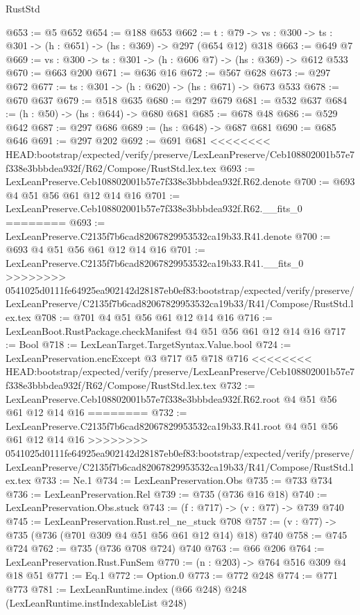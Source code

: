 \begin{lexlean}{RustStd}
\begin{coremodule}
{\begin{coremodule}
@653 := @5 @652
@654 := @188 @653
@662 := {t : @79} -> {vs : @300} -> {ts : @301} -> (h : @651) -> (hs : @369) -> @297 (@654 @12) @318
@663 := @649 @7
@669 := {vs : @300} -> {ts : @301} -> (h : @606 @7) -> (hs : @369) -> @612 @533
@670 := @663 @200
@671 := @636 @16
@672 := @567 @628
@673 := @297 @672
@677 := {ts : @301} -> (h : @620) -> (hs : @671) -> @673 @533
@678 := @670 @637
@679 := @518 @635
@680 := @297 @679
@681 := @532 @637
@684 := (h : @50) -> (hs : @644) -> @680 @681
@685 := @678 @48
@686 := @529 @642
@687 := @297 @686
@689 := (hs : @648) -> @687 @681
@690 := @685 @646
@691 := @297 @202
@692 := @691 @681
<<<<<<<< HEAD:bootstrap/expected/verify/preserve/LexLeanPreserve/Ceb108802001b57e7f338e3bbbdea932f/R62/Compose/RustStd.lex.tex
@693 := LexLeanPreserve.Ceb108802001b57e7f338e3bbbdea932f.R62.denote
@700 := @693 @4 @51 @56 @61 @12 @14 @16
@701 := LexLeanPreserve.Ceb108802001b57e7f338e3bbbdea932f.R62.__fits_0
========
@693 := LexLeanPreserve.C2135f7b6cad82067829953532ca19b33.R41.denote
@700 := @693 @4 @51 @56 @61 @12 @14 @16
@701 := LexLeanPreserve.C2135f7b6cad82067829953532ca19b33.R41.__fits_0
>>>>>>>> 0541025d0111fe64925ea902142d28187eb0ef83:bootstrap/expected/verify/preserve/LexLeanPreserve/C2135f7b6cad82067829953532ca19b33/R41/Compose/RustStd.lex.tex
@708 := @701 @4 @51 @56 @61 @12 @14 @16
@716 := LexLeanBoot.RustPackage.checkManifest @4 @51 @56 @61 @12 @14 @16
@717 := Bool
@718 := LexLeanTarget.TargetSyntax.Value.bool
@724 := LexLeanPreservation.encExcept @3 @717 @5 @718 @716
<<<<<<<< HEAD:bootstrap/expected/verify/preserve/LexLeanPreserve/Ceb108802001b57e7f338e3bbbdea932f/R62/Compose/RustStd.lex.tex
@732 := LexLeanPreserve.Ceb108802001b57e7f338e3bbbdea932f.R62.root @4 @51 @56 @61 @12 @14 @16
========
@732 := LexLeanPreserve.C2135f7b6cad82067829953532ca19b33.R41.root @4 @51 @56 @61 @12 @14 @16
>>>>>>>> 0541025d0111fe64925ea902142d28187eb0ef83:bootstrap/expected/verify/preserve/LexLeanPreserve/C2135f7b6cad82067829953532ca19b33/R41/Compose/RustStd.lex.tex
@733 := Ne.{1}
@734 := LexLeanPreservation.Obs
@735 := @733 @734
@736 := LexLeanPreservation.Rel
@739 := @735 (@736 @16 @18)
@740 := LexLeanPreservation.Obs.stuck
@743 := (f : @717) -> (v : @77) -> @739 @740
@745 := LexLeanPreservation.Rust.rel_ne_stuck @708
@757 := (v : @77) -> @735 (@736 (@701 @309 @4 @51 @56 @61 @12 @14) @18) @740
@758 := @745 @724
@762 := @735 (@736 @708 @724) @740
@763 := @66 @206
@764 := LexLeanPreservation.Rust.FunSem
@770 := (n : @203) -> @764 @516 @309 @4 @18 @51
@771 := Eq.{1}
@772 := Option.{0}
@773 := @772 @248
@774 := @771 @773
@781 := LexLeanRuntime.index (@66 @248) @248 (LexLeanRuntime.instIndexableList @248)

\end{coremodule}}
\end{coremodule}
\end{lexlean}
